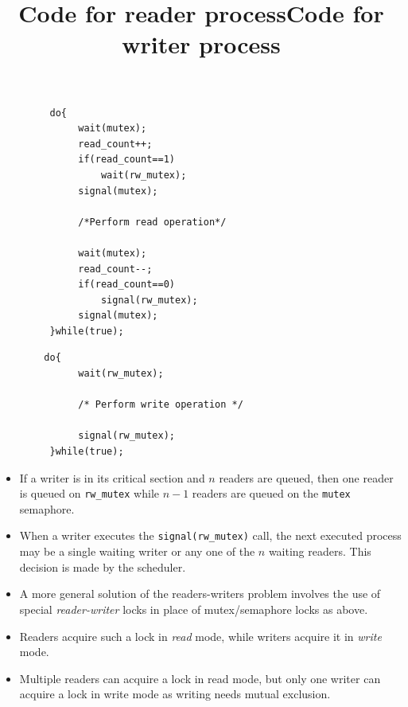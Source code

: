 \documentclass{article}
\theoremstyle{plain}
\theoremstyle{definition}
\begin{document}
\begin{figure}[!ht]
 \begin{minipage}{0.5\textwidth}
  \centering
  \begin{verbatim}
   do{
        wait(mutex);
        read_count++;
        if(read_count==1)
            wait(rw_mutex);
        signal(mutex);
        
        /*Perform read operation*/
        
        wait(mutex);
        read_count--;
        if(read_count==0)
            signal(rw_mutex);
        signal(mutex);
   }while(true);
  \end{verbatim}
  \title{Code for reader process}
 \end{minipage}
 \begin{minipage}{0.5\textwidth}
  \centering
  \begin{verbatim}
  do{
        wait(rw_mutex);
        
        /* Perform write operation */
        
        signal(rw_mutex);
   }while(true);
  \end{verbatim}
  \title{Code for writer process}
 \end{minipage}
\end{figure}
\begin{itemize}
    \item If a writer is in its critical section and $n$ readers are queued, then one reader is queued on \texttt{rw\_mutex} while $n-1$ readers are queued on the \texttt{mutex} semaphore. 
    
    \item When a writer executes the \texttt{signal(rw\_mutex)} call, the next executed process may be a single waiting writer or any one of the $n$ waiting readers. This decision is made by the scheduler. 
    
    \item A more general solution of the readers-writers problem involves the use of special \textit{reader-writer} locks in place of mutex/semaphore locks as above. 
    
    \item Readers acquire such a lock in \textit{read} mode, while writers acquire it in \textit{write} mode. 
    
    \item Multiple readers can acquire a lock in read mode, but only one writer can acquire a lock in write mode as writing needs mutual exclusion. 
\end{itemize}
\end{document}
